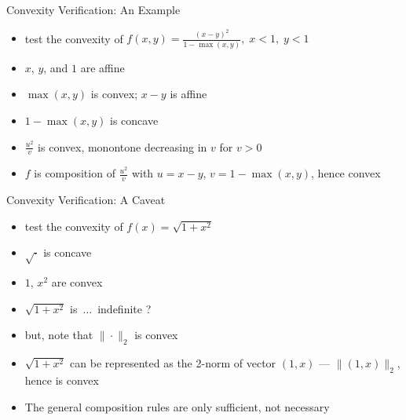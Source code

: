 \documentclass[10pt,handout]{beamer}
\newcommand{\ds}{\displaystyle}
\theoremstyle{definition}
\begin{document}
\begin{frame}{Convexity Verification: An Example}
  \begin{itemize}
    \item test the convexity of $\ds f(x, y) = \frac{(x - y)^2}{1 - \max(x, y)}, \; x < 1,\;y < 1$
    \item $x$, $y$, and $1$ are affine
    \item $\max(x, y)$ is convex; $x - y$ is affine
    \item $1 - \max(x, y)$ is concave
    \item $\ds\frac{u^2}{v}$ is convex, monontone decreasing in $v$ for $v > 0$
    \item $f$ is composition of $\ds\frac{u^2}{v}$ with $u = x - y$, $v = 1 - \max(x, y)$, hence convex
  \end{itemize}
\end{frame}

\begin{frame}{Convexity Verification: A Caveat}
  \begin{itemize}
    \item test the convexity of $\ds f(x) = \sqrt{1 + x^2}$
    \item $\sqrt{\cdot}$ is concave 
    \item $1$, $x^2$ are convex 
    \item $\sqrt{1 + x^2}$ is $\,\ldots\,$ indefinite ?
    \item but, note that $\ds\|\cdot\|_2$ is convex
    \item $\ds\sqrt{1 + x^2}$ can be represented as the 2-norm of vector $(1, x)$ --- $\ds\|(1, x)\|_2$, hence is convex
    \item The general composition rules are only sufficient, not necessary
  \end{itemize}
\end{frame}
\end{document}
